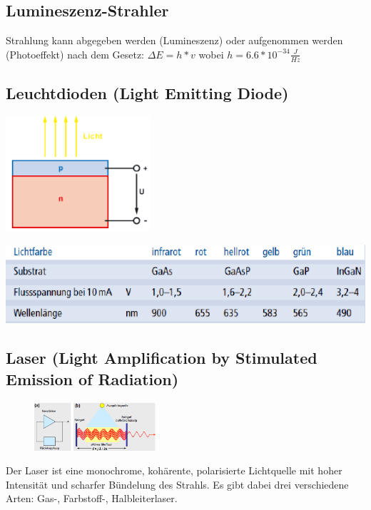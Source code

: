 \subsection{Lumineszenz-Strahler}
Strahlung kann abgegeben werden (Lumineszenz) oder aufgenommen werden (Photoeffekt) nach dem Gesetz: $\Delta E = h*v$ wobei $h = 6.6*10^{-34} \frac{J}{Hz}$

\subsection{Leuchtdioden (Light Emitting Diode)}

\begin{minipage}{0.45\textwidth}
    \includegraphics[width=0.4\textwidth]{images/LED}
\end{minipage}
\begin{minipage}{0.5\textwidth} 
    \vspace{-0.5cm}
    \includegraphics[width=1\textwidth]{images/kennwert_LED}
\end{minipage}

\subsection{Laser (Light Amplification by Stimulated Emission of Radiation)}
\begin{figure}
    \centering
    \includegraphics[width=0.4\textwidth]{images/laser}
\end{figure}
Der Laser ist eine monochrome, kohärente, polarisierte Lichtquelle mit hoher Intensität und scharfer Bündelung des Strahls. Es gibt dabei drei verschiedene Arten: Gas-, Farbstoff-, Halbleiterlaser.

